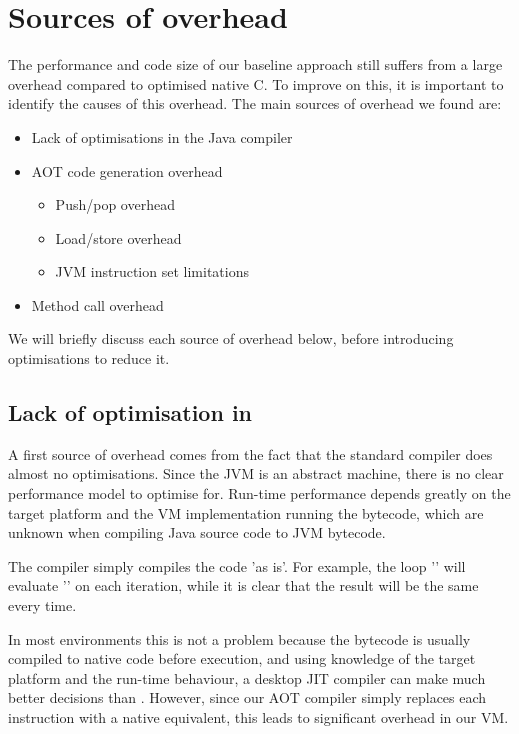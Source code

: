 \section{Sources of overhead}
The performance and code size of our baseline approach still suffers from a large overhead compared to optimised native C. To improve on this, it is important to identify the causes of this overhead. The main sources of overhead we found are:
\begin{itemize}
	\item Lack of optimisations in the Java compiler
	\item AOT code generation overhead
	\begin{itemize}
		\item Push/pop overhead
		\item Load/store overhead
		\item JVM instruction set limitations
	\end{itemize}
	\item Method call overhead
\end{itemize}

We will briefly discuss each source of overhead below, before introducing optimisations to reduce it.

\subsection{Lack of optimisation in }
A first source of overhead comes from the fact that the standard  compiler does almost no optimisations.  Since the JVM is an abstract machine, there is no clear performance model to optimise for. Run-time performance depends greatly on the target platform and the VM implementation running the bytecode, which are unknown when compiling Java source code to JVM bytecode.

The  compiler simply compiles the code 'as is'. For example, the loop '' will evaluate '' on each iteration, while it is clear that the result will be the same every time.

In most environments this is not a problem because the bytecode is usually compiled to native code before execution, and using knowledge of the target platform and the run-time behaviour, a desktop JIT compiler can make much better decisions than . However, since our AOT compiler simply replaces each instruction with a native equivalent, this leads to significant overhead in our VM.

